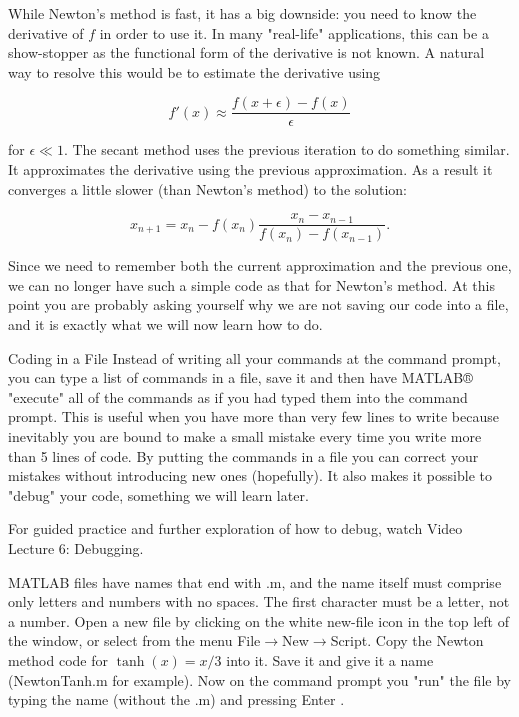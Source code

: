 \documentclass[a4paper,12pt]{article}
\begin{document}
While Newton's method is fast, it has a big downside: you need to know the derivative of \(f\) in order to use it. In many "real-life" applications, this can be a show-stopper as the functional form of the derivative is not known. A natural way to resolve this would be to estimate the derivative using

\begin{equation} \label{eq:dervative:estimate} f'(x)\approx\frac{f(x+\epsilon)-f(x)}{\epsilon} \end{equation}

for \(\epsilon\ll1\). The secant method uses the previous iteration to do something similar. It approximates the derivative using the previous approximation. As a result it converges a little slower (than Newton's method) to the solution:

\begin{equation} \label{eq:3} x_{n+1}=x_n-f(x_n) \frac{x_n-x_{n-1}}{f(x_n)-f(x_{n-1})}. \end{equation}

Since we need to remember both the current approximation and the previous one, we can no longer have such a simple code as that for Newton's method. At this point you are probably asking yourself why we are not saving our code into a file, and it is exactly what we will now learn how to do.

Coding in a File
Instead of writing all your commands at the command prompt, you can type a list of commands in a file, save it and then have MATLAB® "execute" all of the commands as if you had typed them into the command prompt. This is useful when you have more than very few lines to write because inevitably you are bound to make a small mistake every time you write more than 5 lines of code. By putting the commands in a file you can correct your mistakes without introducing new ones (hopefully). It also makes it possible to "debug" your code, something we will learn later.

For guided practice and further exploration of how to debug, watch Video Lecture 6: Debugging.

MATLAB files have names that end with .m, and the name itself must comprise only letters and numbers with no spaces. The first character must be a letter, not a number. Open a new file by clicking on the white new-file icon in the top left of the window, or select from the menu File\(\rightarrow\)New\(\rightarrow\)Script. Copy the Newton method code for \(\tanh(x)=x/3\) into it. Save it and give it a name (NewtonTanh.m for example). Now on the command prompt you "run" the file by typing the name (without the .m) and pressing Enter .
\end{document}

